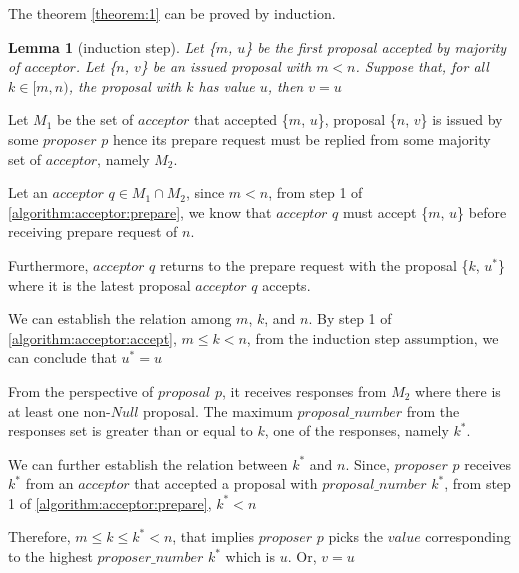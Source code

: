 \documentclass{article}
\newtheorem{lemma}{Lemma}
\begin{document}
    The theorem \ref{theorem:1} can be proved by induction.
    
    \begin{lemma}[induction step]
    Let \{$m$, $u$\} be the first proposal accepted by majority of $acceptor$.
    Let \{$n$, $v$\} be an issued proposal with $m < n$.
    Suppose that, for all $k \in [m, n)$, the proposal with $k$ has value $u$, then $v = u$
    \end{lemma}
    
    Let $M_1$ be the set of $acceptor$ that accepted \{$m$, $u$\}, proposal \{$n$, $v$\} is issued by some $proposer$ $p$ hence its prepare request must be replied from some majority set of $acceptor$, namely $M_2$.
    
    Let an $acceptor$ $q \in M_1 \cap M_2$, since $m < n$, from step 1 of \ref{algorithm:acceptor:prepare}, we know that $acceptor$ $q$ must accept \{$m$, $u$\} before receiving prepare request of $n$.
    
    Furthermore, $acceptor$ $q$ returns to the prepare request with the proposal \{$k$, $u^*$\} where it is the latest proposal $acceptor$ $q$ accepts.
    
    We can establish the relation among $m$, $k$, and $n$. By step 1 of \ref{algorithm:acceptor:accept},  $m \leq k < n$, from the induction step assumption, we can conclude that $u^* = u$
    
    From the perspective of $proposal$ $p$, it receives responses from $M_2$ where there is at least one non-$Null$ proposal. The maximum $proposal\_number$ from the responses set is greater than or equal to $k$, one of the responses, namely $k^*$.
    
    We can further establish the relation between $k^*$ and $n$. Since, $proposer$ $p$ receives $k^*$ from an $acceptor$ that accepted a proposal with $proposal\_number$ $k^*$, from step 1 of \ref{algorithm:acceptor:prepare}, $k^* < n$
    
    Therefore, $m \leq k \leq k^* < n$, that implies $proposer$ $p$ picks the $value$ corresponding to the highest $proposer\_number$ $k^*$ which is $u$. Or, $v = u$



\end{document}
